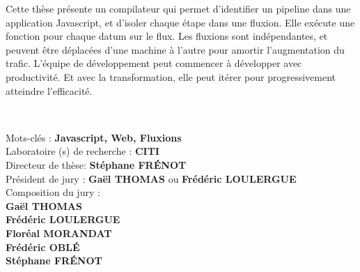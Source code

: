 \begin{framed}
{Cette thèse présente un compilateur qui permet d'identifier un pipeline dans une application Javascript, et d'isoler chaque étape dans une fluxion.
Elle exécute une fonction pour chaque datum sur le flux.
Les fluxions sont indépendantes, et peuvent être déplacées d'une machine à l'autre pour amortir l'augmentation du trafic.
L'équipe de développement peut commencer à développer avec productivité.
Et avec la transformation, elle peut itérer pour progressivement atteindre l’efficacité.

~
}

\noindent %
Mots-clés : \textbf{Javascript, Web, Fluxions}\\[3pt]
Laboratoire (s) de recherche : \textbf{CITI}\\[3pt]
Directeur de thèse: \textbf{Stéphane \MakeUppercase{Frénot}}\\[3pt]
Président de jury : \textbf{Gaël \MakeUppercase{Thomas}} ou \textbf{Frédéric \MakeUppercase{Loulergue}~}\\[3pt]
Composition du jury :\\
\textbf{Gaël \MakeUppercase{Thomas}}\\
\textbf{Frédéric \MakeUppercase{Loulergue}}\\
\textbf{Floréal \MakeUppercase{Morandat}}\\
\textbf{Frédéric \MakeUppercase{Oblé}}\\   
\textbf{Stéphane \MakeUppercase{Frénot}}
\end{framed}

\restoregeometry
\eject